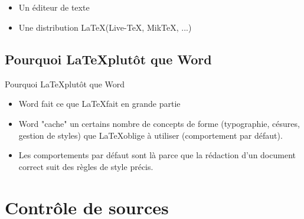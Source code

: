 \subsection{\subsectitle}
\begin{frame}{\sectitle}
    \begin{block}{\subsectitle}
        \begin{itemize}
            \item Un éditeur de texte
            \item Une distribution \LaTeX (Live-TeX, MikTeX, ...)
        \end{itemize}
    \end{block}


\def\subsectitle{Pourquoi \LaTeX plutôt que Word}
\subsection{\subsectitle}
    \begin{block}{\subsectitle}
        \begin{itemize}
            \item Word fait ce que \LaTeX fait en grande partie
            \item Word "cache" un certains nombre de concepts de forme
                (typographie, césures, gestion de styles) que \LaTeX oblige à
                utiliser (comportement par défaut).
            \item Les comportements par défaut sont là parce que la rédaction
                d'un document correct suit des règles de style précis.
        \end{itemize}
    \end{block}
\end{frame}


\def\sectitle{Contrôle de sources}
\section{\sectitle}
\def\subsectitle{Git}
